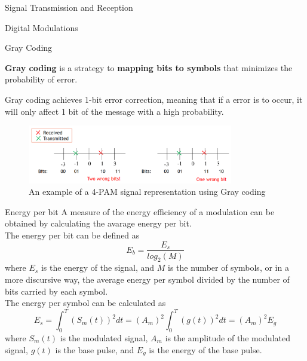 \begin{section}{Signal Transmission and Reception}
\begin{subsection}{Digital Modulations}
\begin{subsubsection}{Gray Coding}
      \begin{boxH}
        \textbf{Gray coding} is a strategy to \textbf{mapping bits to symbols} that minimizes the
        probability of error.
      \end{boxH}
      Gray coding achieves 1-bit error correction, meaning that if a error is to occur, it will only
      affect 1 bit of the message with a high probability.\\
      \begin{figure}[h]
        \centering
        \includegraphics[width=0.8\textwidth]{img/gray coding.png}
        \caption{An example of a 4-PAM signal representation using Gray coding}
        \label{fig:GrayCode}
      \end{figure}
    \end{subsubsection}
    \begin{subsubsection}{Energy per bit}
      A measure of the energy efficiency of a modulation can be obtained by calculating the avarage
      energy per bit.\\
      The energy per bit can be defined as 
      \begin{equation}
        E_b=\frac{E_s}{log_2(M)}
      \end{equation}
      where $E_s$ is the energy of the signal, and $M$ is the number of symbols, or in a more
      discursive way, the average energy per symbol divided by the number of bits carried by 
      each symbol.\\
      The energy per symbol can be calculated as
      \begin{equation}
        E_s=\int_{0}^{T} (S_m(t))^2 dt= (A_m)^2 \int_{0}^{T} (g(t))^2 dt= (A_m)^2 E_g
      \end{equation}
      where $S_m(t)$ is the modulated signal, $A_m$ is the amplitude of the modulated signal, $g(t)$
      is the base pulse, and $E_g$ is the energy of the base pulse.\\


\end{subsubsection}
\end{subsection}
\end{section}
